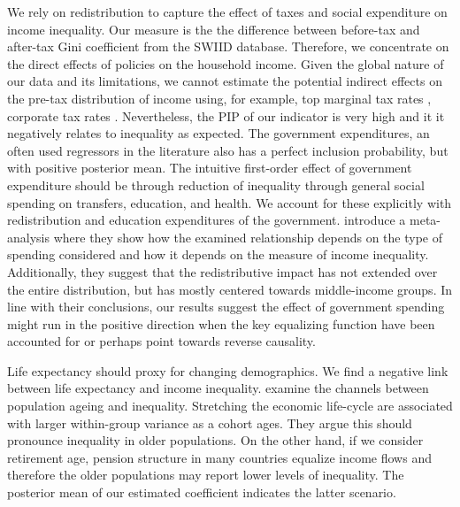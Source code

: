 \begin{refsection}
We rely on redistribution to capture the effect of taxes and social expenditure on income inequality. Our measure is the the difference between before-tax and after-tax Gini coefficient from the \ac{SWIID} database. Therefore, we concentrate on the direct effects of policies on the household income. Given the global nature of our data and its limitations, we cannot estimate the potential indirect effects on the pre-tax distribution of income using, for example, top marginal tax rates \parencite{alvaredoetal2013}, corporate tax rates \parencite{fuest2018higher}. Nevertheless, the \ac{PIP} of our indicator is very high and it it negatively relates to inequality as expected. The government expenditures, an often used regressors in the literature also has a perfect inclusion probability, but with positive posterior mean. The intuitive first-order effect of government expenditure should be through reduction of inequality through general social spending on transfers, education, and health. We account for these explicitly with redistribution and education expenditures of the government. \textcite{anderson2017does} introduce a meta-analysis where they show how the examined relationship depends on the type of spending considered and how it depends on the measure of income inequality. Additionally, they suggest that the redistributive impact has not extended over the entire distribution, but has mostly centered towards middle-income groups. In line with their conclusions, our results suggest the effect of government spending might run in the positive direction when the key equalizing function have been accounted for or perhaps point towards reverse causality.

Life expectancy should proxy for changing demographics. We find a negative link between life expectancy and income inequality. \textcite{goldsteinlee2014} examine the channels between population ageing and inequality. Stretching the economic life-cycle are associated with larger within-group variance as a cohort ages. They argue this should pronounce inequality in older populations. On the other hand, if we consider retirement age, pension structure in many countries equalize income flows and therefore the older populations may report lower levels of inequality. The posterior mean of our estimated coefficient indicates the latter scenario.


\end{refsection}

